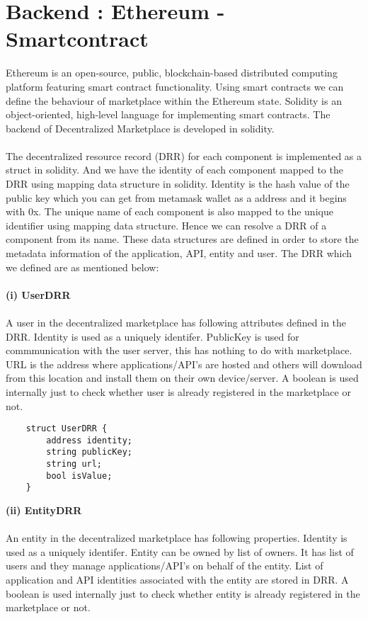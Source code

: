 \section{Backend : Ethereum - Smartcontract}
Ethereum is an open-source, public, blockchain-based distributed computing platform featuring smart contract functionality. Using smart contracts we can define the behaviour of marketplace within the Ethereum state. Solidity is an object-oriented, high-level language for implementing smart contracts. The backend of Decentralized Marketplace is developed in solidity.\cite{WEBSITE:1}
\\
\\
The decentralized resource record (DRR) for each component is implemented as a struct in solidity. And we have the identity of each component mapped to the DRR using mapping data structure in solidity. Identity is the hash value of the public key which you can get from metamask wallet as a address and it begins with 0x. The unique name of each component is also mapped to the unique identifier using mapping data structure. Hence we can resolve a DRR of a component from its name. These data structures are defined in order to store the metadata information of the application, API, entity and user. The DRR which we defined are as mentioned below:
\\
\\
\textbf{(i) UserDRR}
\\
\\
A user in the decentralized marketplace has following attributes defined in the DRR. Identity is used as a uniquely identifer. PublicKey is used for commmunication with the user server, this has nothing to do with marketplace. URL is the address where applications/API's are hosted and others will download from this location and install them on their own device/server. A boolean is used internally just to check whether user is already registered in the marketplace or not. 

\begin{lstlisting}
    struct UserDRR {
        address identity;
        string publicKey;
        string url;
        bool isValue;
    }
\end{lstlisting}
\textbf{(ii) EntityDRR}
\\
\\
An entity in the decentralized marketplace has following properties. Identity is used as  a uniquely identifer. Entity can be owned by list of owners. It has list of users and they manage applications/API's on behalf of the entity. List of application and API identities associated with the entity are stored in DRR. A boolean is used internally just to check whether entity is already registered in the marketplace or not.

